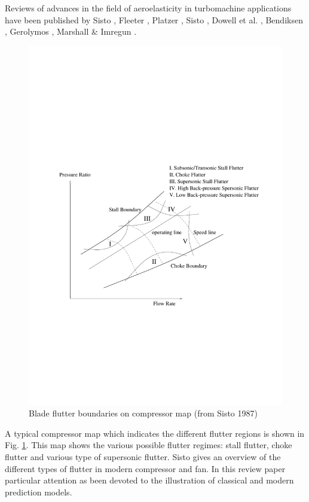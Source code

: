  Reviews of advances in the field of aeroelasticity in turbomachine applications
 have been published by Sisto \citeyear{Sisto:4}, Fleeter \citeyear{Fleeter:1},
 Platzer \citeyear{Platzer:1}, Sisto \citeyear{Sisto:2},
 Dowell et al. \citeyear{Sisto:3}, Bendiksen \citeyear{Bendiksen:1},
 Gerolymos \citeyear{Gerolymos:1}, Marshall \& Imregun \citeyear{Imregun:1}.
%
\begin{figure}
  \centerline{\includegraphics[width=130mm, clip=t]{CHAP_INTRO/FIGURE/fan_map.pdf}}
  \caption{Blade flutter boundaries on compressor map (from Sisto 1987)}
  \label{fan_map.fig}
\end{figure}
%

 A typical compressor map which indicates the different flutter regions
 is shown in Fig. \ref{fan_map.fig}. This map shows the various possible
 flutter regimes: stall flutter, choke flutter and various type of
 supersonic flutter.
 Sisto \citeyear{Sisto:1} gives an overview of the different types of
 flutter in modern compressor and fan. In this review paper
 particular attention as been devoted to the illustration of classical
 and modern prediction models.
%
%
%
